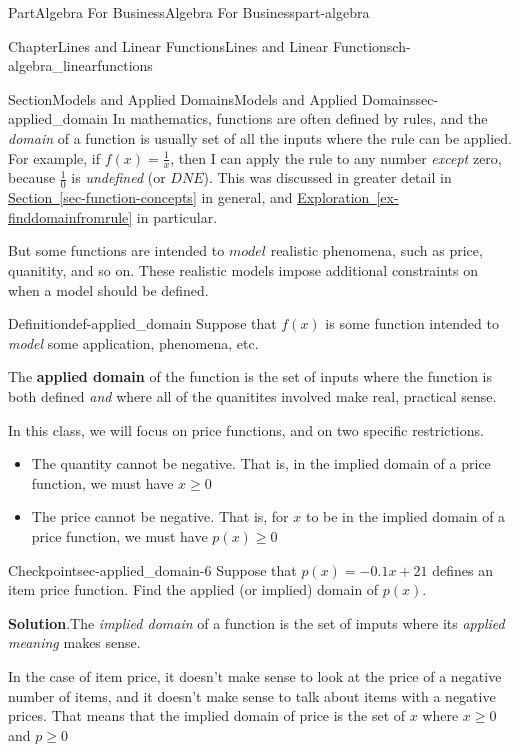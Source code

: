 \documentclass[oneside,10pt,]{tufte-book}
\newcommand{\blocktitlefont}{\relax}
\newcommand{\xreffont}{\relax}
\newcommand{\terminology}[1]{\textbf{#1}}
\numberwithin{equation}{chapter}
\begin{document}
\begin{partptx}{Part}{Algebra For Business}{}{Algebra For Business}{}{}{part-algebra}
\begin{chapterptx}{Chapter}{Lines and Linear Functions}{}{Lines and Linear Functions}{}{}{ch-algebra_linearfunctions}
\typeout{************************************************}
%
\begin{sectionptx}{Section}{Models and Applied Domains}{}{Models and Applied Domains}{}{}{sec-applied_domain}
In mathematics, functions are often defined by rules, and the  \emph{domain} of a function is usually set of all the inputs where the rule can be applied.  For example, if \(f(x) = \frac{1}{x}\), then I can apply the rule to any number \emph{except} zero, because \(\frac{1}{0}\) is \emph{undefined} (or \(DNE\)). This was discussed in greater detail in \hyperref[sec-function-concepts]{Section~{\xreffont\ref{sec-function-concepts}}} in general, and \hyperref[ex-finddomainfromrule]{Exploration~{\xreffont\ref{ex-finddomainfromrule}}} in particular.%
\par
But some functions are intended to \(model\) realistic phenomena, such as price, quanitity, and so on.  These realistic models impose additional constraints on when a model should be defined.%
\begin{definition}{Definition}{}{def-applied_domain}%
Suppose that \(f(x)\) is some function intended to \emph{model} some application, phenomena, etc.%
\par
The \terminology{applied domain} of the function is the set of inputs where the function is both defined \emph{and} where all of the quanitites involved make real, practical sense.%
\end{definition}
In this class, we will focus on price functions, and on two specific restrictions.%
\begin{itemize}[label=\textbullet]
\item{}The quantity cannot be negative.  That is, in the implied domain of a price function, we must have \(x\geq 0\)%
\item{}The price cannot be negative.  That is, for \(x\) to be in the implied domain of a price function, we must have \(p(x) \geq 0\)%
\end{itemize}
%
\begin{inlineexercise}{Checkpoint}{}{sec-applied_domain-6}%
Suppose that \(p(x) = -0.1x + 21\) defines an item price function. Find the applied (or implied) domain of \(p(x)\).%
\par\smallskip%
\noindent\textbf{\blocktitlefont Solution}.\hypertarget{sec-applied_domain-6-2}{}\quad{}The \emph{implied domain} of a function is the set of imputs where its \emph{applied meaning} makes sense.%
\par
In the case of item price, it doesn't make sense to look at the price of a negative number of items, and it doesn't make sense to talk about items with a negative prices.  That means that the implied domain of price is the set of \(x\) where \(x\geq 0\) and \(p\geq 0\)%

\end{inlineexercise}
\end{sectionptx}
\end{chapterptx}
\end{partptx}
\end{document}
